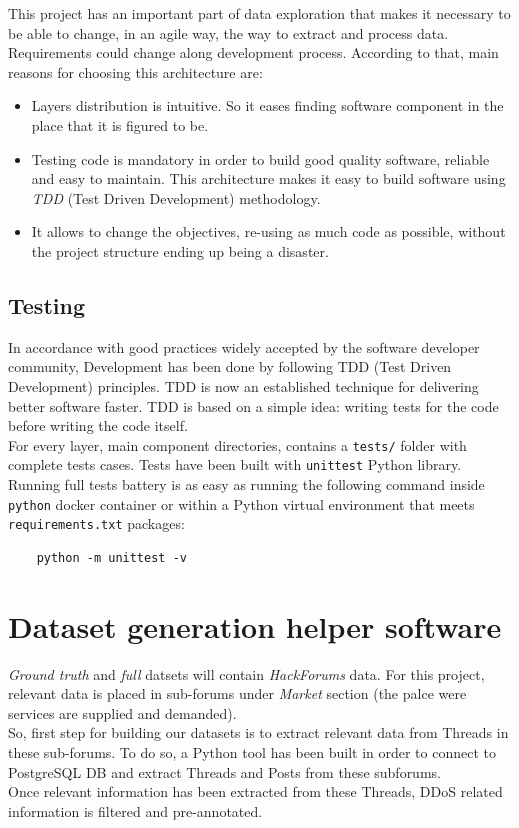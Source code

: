 This project has an important part of data exploration that makes it necessary to be able to change, in an agile way, the way to extract and process data. \\
Requirements could change along development process. According to that, main reasons for choosing this architecture are:
\begin{itemize}
    \item Layers distribution is intuitive. So it eases finding software component in the place that it is figured to be.
    \item Testing code is mandatory in order to build good quality software, reliable and easy to maintain. This architecture makes it easy to build software using \textit{TDD} (Test Driven Development) methodology.
    \item It allows to change the objectives, re-using as much code as possible, without the project structure ending up being a disaster.
\end{itemize}

\subsection{Testing}
In accordance with good practices widely accepted by the software developer community, Development has been done by following TDD (Test Driven Development) principles. TDD is now an established technique for delivering better software faster. TDD is based on a simple idea: writing tests for the code before writing the code itself. \\
For every layer, main component directories, contains a \texttt{tests/} folder with complete tests cases. Tests have been built with \texttt{unittest} Python library. \\
Running full tests battery is as easy as running the following command inside \texttt{python} docker container or within a Python virtual environment that meets \texttt{requirements.txt} packages:
\begin{verbatim}
    python -m unittest -v
\end{verbatim}

\section{Dataset generation helper software}
\label{sec:automaticprocess}

\textit{Ground truth} and \textit{full} datsets will contain \textit{HackForums} data. For this project, relevant data is placed in sub-forums under \textit{Market} section (the palce were services are supplied and demanded). \\
So, first step for building our datasets is to extract relevant data from Threads in these sub-forums. To do so, a Python tool has been built in order to connect to PostgreSQL DB and extract Threads and Posts from these subforums. \\
Once relevant information has been extracted from these Threads, DDoS related information is filtered and pre-annotated.

